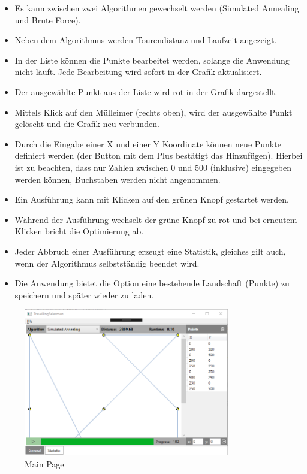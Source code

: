 \documentclass[a4paper, 12pt]{article}
\begin{document}
\begin{itemize}
\item Es kann zwischen zwei Algorithmen gewechselt werden (Simulated Annealing und Brute Force).
\item Neben dem Algorithmus werden Tourendistanz und Laufzeit angezeigt.
\item In der Liste k\"onnen die Punkte bearbeitet werden, solange die Anwendung nicht l\"auft. Jede Bearbeitung wird sofort in der Grafik aktualisiert.
\item Der ausgew\"ahlte Punkt aus der Liste wird rot in der Grafik dargestellt.
\item Mittels Klick auf den M\"ulleimer (rechts oben), wird der ausgew\"ahlte Punkt gel\"oscht und die Grafik neu verbunden.
\item Durch die Eingabe einer X und einer Y Koordinate k\"onnen neue Punkte definiert werden (der Button mit dem Plus best\"atigt das Hinzuf\"ugen). Hierbei ist zu beachten, dass nur Zahlen zwischen 0 und 500 (inklusive) eingegeben werden k\"onnen, Buchstaben werden nicht angenommen.
\item Ein Ausf\"uhrung kann mit Klicken auf den gr\"unen Knopf gestartet werden.
\item W\"ahrend der Ausf\"uhrung wechselt der gr\"une Knopf zu rot und bei erneutem Klicken bricht die Optimierung ab.
\item Jeder Abbruch einer Ausf\"uhrung erzeugt eine Statistik, gleiches gilt auch, wenn der Algorithmus selbstst\"andig beendet wird.
\item Die Anwendung bietet die Option eine bestehende Landschaft (Punkte) zu speichern und sp\"ater wieder zu laden.
\end{itemize}

\begin{figure}[tbh]
    \centering
    \includegraphics[width=0.8\textwidth]{mainPage}
    \caption{Main Page}
    \label{fig:main_page}
\end{figure}
\end{document}
